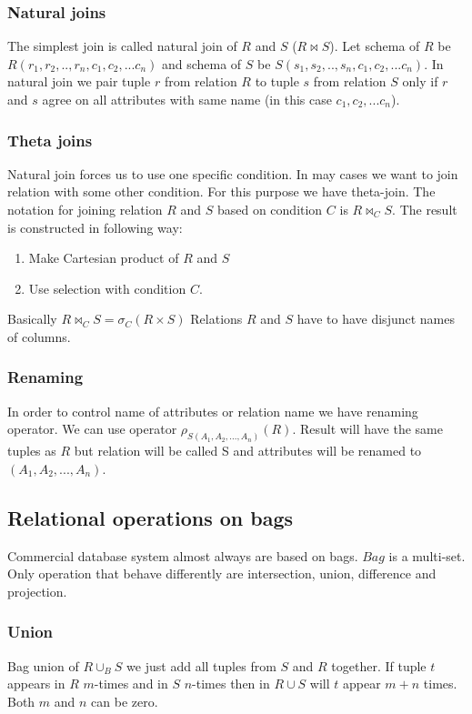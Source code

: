 \subsubsection{Natural joins}
The simplest join is called natural join of $R$ and $S$ ($R \Join S$). Let schema of $R$ be $R(r_1,r_2,..,r_n,c_1,c_2,...c_n)$ and schema of $S$ be  $S(s_1,s_2,..,s_n,c_1,c_2,...c_n)$. In natural join we pair tuple $r$ from relation $R$ to tuple $s$ from relation $S$ only if $r$ and $s$ agree on all attributes with same name (in this case $c_1,c_2,...c_n$).

\subsubsection{Theta joins}
Natural join forces us to use one specific condition. In may cases we want to join relation with some other condition. For this purpose we have theta-join. The notation for joining relation $R$ and $S$ based on condition $C$ is $R\Join_C S$. The result is constructed in following way:

\begin{enumerate}
\item Make Cartesian product of $R$ and $S$
\item Use selection with condition $C$.
\end{enumerate}

Basically $R\Join_C S=\sigma_C(R \times S)$ Relations $R$ and $S$ have to have disjunct names of columns.

\subsubsection{Renaming}

In order to control name of attributes or relation name we have renaming operator. We can use operator $\rho_{S(A_1,A_2,...,A_n)}(R)$. Result will have the same tuples as $R$ but relation will be called S and attributes will be renamed to $(A_1,A_2,...,A_n)$.

\subsection{Relational operations on bags}

Commercial database system almost always are based on bags. $Bag$ is a multi-set. Only operation that behave differently are intersection, union, difference and projection.

\subsubsection{Union}
Bag union of $R \cup_B S$ we just add all tuples from $S$ and $R$ together. If tuple $t$ appears in $R$ $m$-times and in $S$ $n$-times then in  $R \cup S$ will $t$ appear $m+n$ times. Both $m$ and $n$ can be zero.

